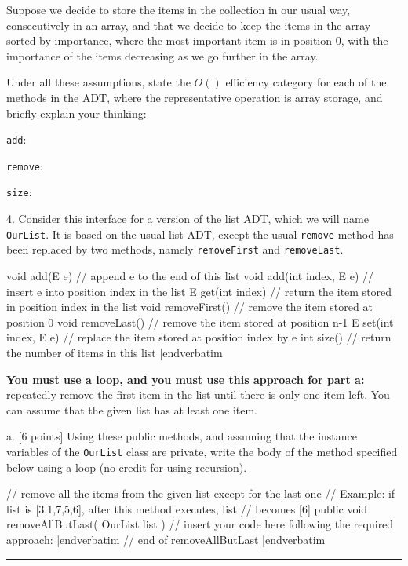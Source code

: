 Suppose we decide to store the items in the collection in our usual way, consecutively
in an array, and that we decide to keep the items in the array sorted by importance, where
the most important item is in position 0, with the importance of the items decreasing
as we go further in the array.
\medskip

Under all these assumptions, state the $O()$ efficiency category for each of the methods in
the ADT, where the representative operation is array storage, and briefly explain your thinking:
\bigskip

{\tt add}:
\vfil

{\tt remove}:
\vfil

{\tt size}:

\vfil

\newtestpage{\courselabel}{\testlabel}{}
\item{4.}
Consider this interface for a version of the list ADT, which we will name
{\tt OurList}.  It is based on the usual list ADT,
except the usual {\tt remove} method has been replaced by
two methods, namely {\tt removeFirst} and {\tt removeLast}.
\medskip

{\baselineskip
\verbatim
void add(E e)      // append e to the end of this list
void	add(int index, E e)      // insert e into position index in the list
E get(int index)  // return the item stored in position index in the list
void removeFirst()     // remove the item stored at position 0
void removeLast()    // remove the item stored at position n-1
E set(int index, E e)  // replace the item stored at position index by e 
int size()                     // return the number of items in this list
 |endverbatim
 \par}

{\bf You must use a loop, and you must use this approach for part a:}  repeatedly remove the
first item in the list until there is only one item left.  You can assume that the given list
has at least one item.
\medskip

\item{a.} [6 points]
Using these public methods, and assuming that the instance variables of the
{\tt OurList} class are private, write the body of the method specified below using a
loop (no credit for using recursion).
\medskip

\verbatim
// remove all the items from the given list except for the last one
//  Example:  if  list is [3,1,7,5,6], after this method executes, list
//                     becomes [6]
public void removeAllButLast( OurList list )
{  // insert your code here following the required approach:
|endverbatim
\vfil
\verbatim
}// end of removeAllButLast
|endverbatim
\bigskip
\hrule
\bigskip

